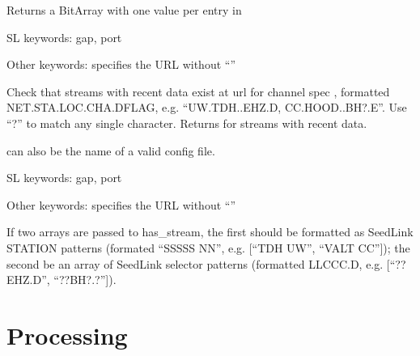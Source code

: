 \documentclass[letterpaper,11pt,english]{sphinxmanual}
\begin{document}
Returns a BitArray with one value per entry in 

\begin{fulllineitems}
\label{\detokenize{src/Web/seedlink:has_stream}}
\end{fulllineitems}


\begin{DUlineblock}{0em}
\item[] SL keywords: gap, port
\item[] Other keywords:  specifies the URL without “”
\end{DUlineblock}

Check that streams with recent data exist at url  for channel spec
, formatted NET.STA.LOC.CHA.DFLAG, e.g. “UW.TDH..EHZ.D,
CC.HOOD..BH?.E”. Use “?” to match any single character. Returns 
for streams with recent data.

 can also be the name of a valid config file.


\begin{fulllineitems}
\end{fulllineitems}


\begin{DUlineblock}{0em}
\item[] SL keywords: gap, port
\item[] Other keywords:  specifies the URL without “”
\end{DUlineblock}

If two arrays are passed to has\_stream, the first should be
formatted as SeedLink STATION patterns (formated “SSSSS NN”, e.g.
{[}“TDH UW”, “VALT CC”{]}); the second be an array of SeedLink selector
patterns (formatted LLCCC.D, e.g. {[}“??EHZ.D”, “??BH?.?”{]}).


\chapter{Processing}
\label{\detokenize{index:processing}}
\end{document}
